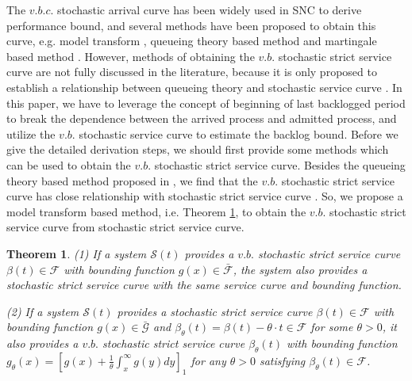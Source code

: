 \documentclass[paper]{ieice}
\newtheorem{theorem}{Theorem}
\begin{document}
The $v.b.c.$ stochastic arrival curve has been widely used in SNC to derive performance bound, and several methods have been proposed to obtain this curve, e.g. model transform \cite{jiang2006basic,Wu2010Model,JiangLiu-15877}, queueing theory based method \cite{Wu2010Model} and martingale based method \cite{jiang2010note}. However, methods of obtaining the $v.b.$ stochastic strict service curve are not fully discussed in the literature, because it is only proposed to establish a relationship between queueing theory and stochastic service curve \cite{Wu2010Model}. In this paper, we have to leverage the concept of beginning of last backlogged period \cite{Fidl06} to break the dependence between the arrived process and admitted process, and utilize the $v.b.$ stochastic service curve to estimate the backlog bound. Before we give the detailed derivation steps, we should first provide some methods which can be used to obtain the $v.b.$ stochastic strict service curve. Besides the queueing theory based method proposed in \cite{Wu2010Model}, we find that the $v.b.$ stochastic strict service curve has close relationship with stochastic strict service curve \cite{JiangLiu-15877}. So, we propose a model transform based method, i.e. Theorem \ref{mtrans}, to obtain the $v.b.$ stochastic strict service curve from stochastic strict service curve.
\begin{theorem}\label{mtrans}
(1) If a system $\mathcal{S}(t)$ provides a $v.b.$ stochastic strict service curve $\beta(t)\in\mathcal{F}$ with bounding function $g(x)\in\bar{\mathcal{F}}$, the system also provides a stochastic strict service curve with the same service curve and bounding function.

(2) If a system $\mathcal{S}(t)$ provides a stochastic strict service curve $\beta(t)\in\mathcal{F}$ with bounding function $g(x)\in\bar{\mathcal{G}}$ and $\beta_{\theta}(t)=\beta(t)-\theta\cdot t\in\mathcal{F}$ for some $\theta>0$, it also provides a $v.b.$ stochastic strict service curve $\beta_{\theta}(t)$ with bounding function $g_{\theta}(x)=[g(x)+\frac{1}{\theta}\int_x^\infty g(y)dy]_1$ for any $\theta>0$ satisfying $\beta_{\theta}(t)\in\mathcal{F}$.
\end{theorem}
\end{document}
